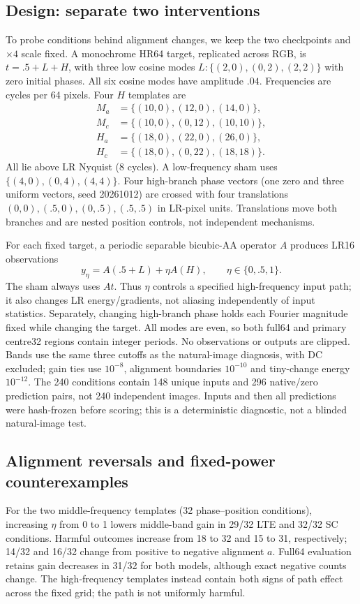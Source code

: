\subsection{Design: separate two interventions}
To probe conditions behind alignment changes, we keep the two checkpoints
and $\times4$ scale fixed. A monochrome HR64 target, replicated across
RGB, is $t=.5+L+H$, with three low cosine modes
$L:\{(2,0),(0,2),(2,2)\}$ with zero initial phases. All six cosine modes
have amplitude $.04$. Frequencies are
cycles per 64 pixels. Four $H$ templates are
\begin{align*}
 M_a&=\{(10,0),(12,0),(14,0)\},\\
 M_c&=\{(10,0),(0,12),(10,10)\},\\
 H_a&=\{(18,0),(22,0),(26,0)\},\\
 H_c&=\{(18,0),(0,22),(18,18)\}.
\end{align*}
All lie above LR Nyquist (8 cycles). A low-frequency sham uses
$\{(4,0),(0,4),(4,4)\}$. Four high-branch phase vectors (one zero and
three uniform vectors, seed 20261012) are crossed with four translations
$(0,0),(.5,0),(0,.5),(.5,.5)$ in LR-pixel units. Translations move both
branches and are nested position controls, not independent mechanisms.

For each fixed target, a periodic separable bicubic-AA operator $A$
produces LR16 observations
\begin{equation}
 y_\eta=A(.5+L)+\eta A(H),\qquad \eta\in\{0,.5,1\}.
 \label{eq:path}
\end{equation}
The sham always uses $At$. Thus $\eta$ controls a specified high-frequency
input path; it also changes LR energy/gradients, not aliasing independently
of input statistics. Separately, changing high-branch phase holds each
Fourier magnitude fixed while changing the target. All modes are even,
so both full64 and primary centre32 regions contain integer periods.
No observations or outputs are clipped. Bands use the same three cutoffs
as the natural-image diagnosis, with DC excluded; gain ties use
$10^{-8}$, alignment boundaries $10^{-10}$ and tiny-change energy $10^{-12}$.
The 240 conditions contain 148
unique inputs and 296 native/zero prediction pairs, not 240 independent
images. Inputs and then all predictions were hash-frozen before scoring;
this is a deterministic diagnostic, not a blinded natural-image test.



\subsection{Alignment reversals and fixed-power counterexamples}
For the two middle-frequency templates (32 phase--position conditions),
increasing $\eta$ from 0 to 1 lowers middle-band gain in 29/32 LTE and
32/32 SC conditions. Harmful outcomes increase from 18 to 32 and 15 to
31, respectively; 14/32 and 16/32 change from positive to negative
alignment $a$. Full64 evaluation retains gain decreases in 31/32 for
both models, although exact negative counts change. The high-frequency
templates instead contain both signs of path effect
across the fixed grid; the path is not uniformly harmful.

